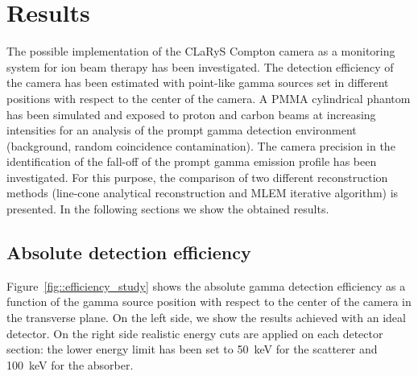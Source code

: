 \section{Results}

The possible implementation of the CLaRyS Compton camera as a monitoring system for ion beam therapy has been investigated. The detection efficiency of the camera has been estimated with point-like gamma sources set in different positions with respect to the center of the camera. A PMMA cylindrical phantom has been simulated and exposed to proton and carbon beams at increasing intensities for an analysis of the prompt gamma detection environment (background, random coincidence contamination). The camera precision in the identification of the fall-off of the prompt gamma emission profile has been investigated. For this purpose, the comparison of two different reconstruction methods (line-cone analytical reconstruction and MLEM iterative algorithm) is presented. In the following sections we show the obtained results. 


\subsection{Absolute detection efficiency}
\label{Results::efficiency}

Figure~\ref{fig::efficiency_study} shows the absolute gamma detection efficiency as a function of the gamma source position with respect to the center of the camera in the transverse plane. On the left side, we show the results achieved with an ideal detector. On the right side realistic energy cuts are applied on each detector section: the lower energy limit has been set to 50~keV for the scatterer and 100~keV for the absorber. 

